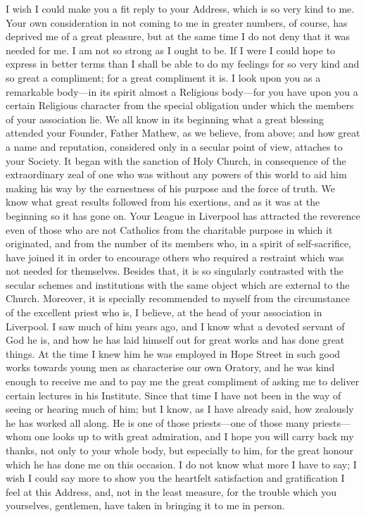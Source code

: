 I wish I could make you a fit reply to your Address, which is so
very kind to me. Your own consideration in not coming to me in greater
numbers, of course, has deprived me of a great pleasure, but at the
same time I do not deny that it was needed for me. I am not so strong
as I ought to be. If I were I could hope to express in better terms
than I shall be able to do my feelings for so very kind and so great a
compliment; for a great compliment it is. I look upon you as a
remarkable body—in its spirit almost a Religious body—for you have
upon you a certain Religious character from the special obligation
under which the members of your association lie. We all know in its
beginning what a great blessing attended your Founder, Father Mathew,
as we believe, from above; and how great a name and reputation,
considered only in a secular point of view, attaches to your Society.
It began with the sanction of Holy Church, in consequence of the
extraordinary zeal of one who was without any powers of this world to
aid him making his way by the earnestness of his purpose and the
force of truth. We know what great results followed from his
exertions, and as it was at the beginning so it has gone on. Your
League in Liverpool has attracted the reverence even of those who are
not Catholics from the charitable purpose in which it originated, and
from the number of its members who, in a spirit of self-sacrifice,
have joined it in order to encourage others who required a restraint
which was not needed for themselves. Besides that, it is so singularly
contrasted with the secular schemes and institutions with the same
object which are external to the Church. Moreover, it is specially
recommended to myself from the circumstance of the excellent priest
who is, I believe, at the head of your association in Liverpool. I saw
much of him years ago, and I know what a devoted servant of God he is,
and how he has laid himself out for great works and has done great
things. At the time I knew him he was employed in Hope Street in such
good works towards young men as characterise our own Oratory, and he
was kind enough to receive me and to pay me the great compliment of
asking me to deliver certain lectures in his Institute. Since
that time I have not been in the way of seeing or hearing much of him;
but I know, as I have already said, how zealously he has worked all
along. He is one of those priests—one of those many priests—whom
one looks up to with great admiration, and I hope you will carry back
my thanks, not only to your whole body, but especially to him, for the
great honour which he has done me on this occasion. I do not know what
more I have to say; I wish I could say more to show you the heartfelt
satisfaction and gratification I feel at this Address, and, not in the
least measure, for the trouble which you yourselves, gentlemen, have
taken in bringing it to me in person.

